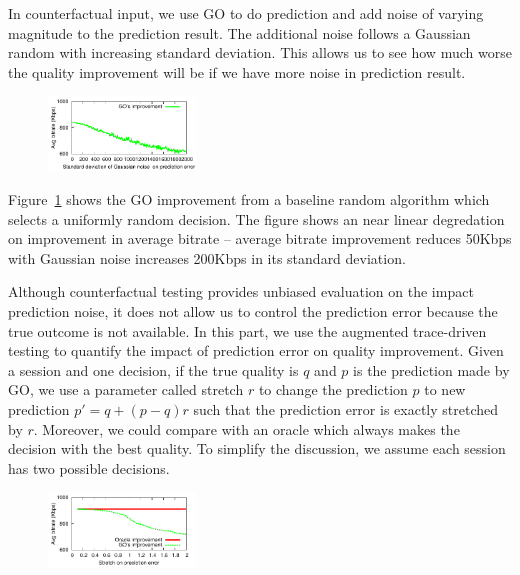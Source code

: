 In counterfactual input, we use GO to do prediction and add noise of varying magnitude to the prediction result. The additional noise follows a Gaussian random with increasing standard deviation.
This allows us to see how much worse the quality improvement will be if we have more noise in prediction result. 

\begin{figure}[h!]
\centering
 \includegraphics[width=0.35\textwidth] {figures/newfig/trendNoise-metricId1-keyGlobal-partition.pdf}
\label{fig:trace-accuracy-1}
\end{figure}

Figure~\ref{fig:trace-accuracy-1} shows the GO improvement from a baseline random algorithm which selects a uniformly random decision. The figure shows an near linear degredation on improvement in average bitrate -- average bitrate improvement reduces 50Kbps with Gaussian noise increases 200Kbps in its standard deviation.



Although counterfactual testing provides unbiased evaluation on the impact prediction noise, it does not allow us to control the prediction error because the true outcome is not available. In this part, we use the augmented trace-driven testing to quantify the impact of prediction error on quality improvement. Given a session and one decision, if the true quality is $q$ and $p$ is the prediction made by GO, we use a parameter called stretch $r$ to change the prediction $p$ to new prediction $p'=q+(p-q)r$ such that the prediction error is exactly stretched by $r$. 
Moreover, we could compare with an oracle which always makes the decision with the best quality. To simplify the discussion, we assume each session has two  possible decisions. 

\begin{figure}[h!]
\centering
 \includegraphics[width=0.35\textwidth] {figures/newfig/trendAccuracy-metricId1-keyGlobal-partition.pdf}
\label{fig:trace-accuracy-2}
\end{figure}

